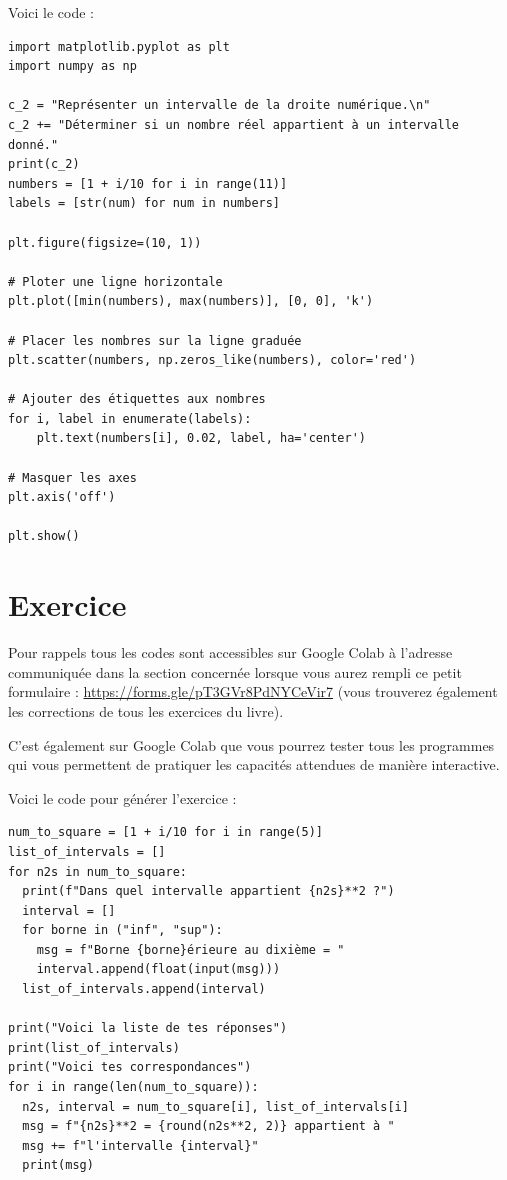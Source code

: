 \documentclass[a4paper, 11pt, twoside]{book}
\begin{document}
Voici le code :

\begin{verbatim}
import matplotlib.pyplot as plt
import numpy as np

c_2 = "Représenter un intervalle de la droite numérique.\n"
c_2 += "Déterminer si un nombre réel appartient à un intervalle donné."
print(c_2)
numbers = [1 + i/10 for i in range(11)]
labels = [str(num) for num in numbers]

plt.figure(figsize=(10, 1))

# Ploter une ligne horizontale
plt.plot([min(numbers), max(numbers)], [0, 0], 'k')

# Placer les nombres sur la ligne graduée
plt.scatter(numbers, np.zeros_like(numbers), color='red')

# Ajouter des étiquettes aux nombres
for i, label in enumerate(labels):
    plt.text(numbers[i], 0.02, label, ha='center')

# Masquer les axes
plt.axis('off')

plt.show()
\end{verbatim}

\section{Exercice}
\label{sec:org837f3c6}
Pour rappels tous les codes sont accessibles sur Google Colab à
l'adresse communiquée dans la section concernée lorsque vous
aurez rempli ce petit formulaire :
\url{https://forms.gle/pT3GVr8PdNYCeVir7} (vous trouverez également
les corrections de tous les exercices du livre).

C'est également sur Google Colab que vous pourrez tester tous les
programmes qui vous permettent de pratiquer les capacités attendues
de manière interactive.

Voici le code pour générer l'exercice :

\begin{verbatim}
num_to_square = [1 + i/10 for i in range(5)]
list_of_intervals = []
for n2s in num_to_square:
  print(f"Dans quel intervalle appartient {n2s}**2 ?")
  interval = []
  for borne in ("inf", "sup"):
    msg = f"Borne {borne}érieure au dixième = "
    interval.append(float(input(msg)))
  list_of_intervals.append(interval)

print("Voici la liste de tes réponses")
print(list_of_intervals)
print("Voici tes correspondances")
for i in range(len(num_to_square)):
  n2s, interval = num_to_square[i], list_of_intervals[i]
  msg = f"{n2s}**2 = {round(n2s**2, 2)} appartient à "
  msg += f"l'intervalle {interval}"
  print(msg)
\end{verbatim}
\end{document}
